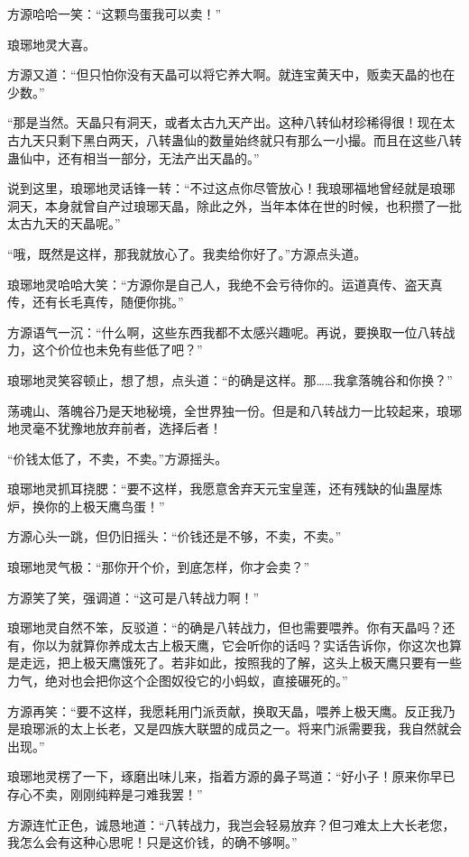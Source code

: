 \begin{this_body}
方源哈哈一笑：“这颗鸟蛋我可以卖！”

琅琊地灵大喜。

方源又道：“但只怕你没有天晶可以将它养大啊。就连宝黄天中，贩卖天晶的也在少数。”

“那是当然。天晶只有洞天，或者太古九天产出。这种八转仙材珍稀得很！现在太古九天只剩下黑白两天，八转蛊仙的数量始终就只有那么一小撮。而且在这些八转蛊仙中，还有相当一部分，无法产出天晶的。”

说到这里，琅琊地灵话锋一转：“不过这点你尽管放心！我琅琊福地曾经就是琅琊洞天，本身就曾自产过琅琊天晶，除此之外，当年本体在世的时候，也积攒了一批太古九天的天晶呢。”

“哦，既然是这样，那我就放心了。我卖给你好了。”方源点头道。

琅琊地灵哈哈大笑：“方源你是自己人，我绝不会亏待你的。运道真传、盗天真传，还有长毛真传，随便你挑。”

方源语气一沉：“什么啊，这些东西我都不太感兴趣呢。再说，要换取一位八转战力，这个价位也未免有些低了吧？”

琅琊地灵笑容顿止，想了想，点头道：“的确是这样。那……我拿落魄谷和你换？”

荡魂山、落魄谷乃是天地秘境，全世界独一份。但是和八转战力一比较起来，琅琊地灵毫不犹豫地放弃前者，选择后者！

“价钱太低了，不卖，不卖。”方源摇头。

琅琊地灵抓耳挠腮：“要不这样，我愿意舍弃天元宝皇莲，还有残缺的仙蛊屋炼炉，换你的上极天鹰鸟蛋！”

方源心头一跳，但仍旧摇头：“价钱还是不够，不卖，不卖。”

琅琊地灵气极：“那你开个价，到底怎样，你才会卖？”

方源笑了笑，强调道：“这可是八转战力啊！”

琅琊地灵自然不笨，反驳道：“的确是八转战力，但也需要喂养。你有天晶吗？还有，你以为就算你养成太古上极天鹰，它会听你的话吗？实话告诉你，你这次也算是走远，把上极天鹰饿死了。若非如此，按照我的了解，这头上极天鹰只要有一些力气，绝对也会把你这个企图奴役它的小蚂蚁，直接碾死的。”

方源再笑：“要不这样，我愿耗用门派贡献，换取天晶，喂养上极天鹰。反正我乃是琅琊派的太上长老，又是四族大联盟的成员之一。将来门派需要我，我自然就会出现。”

琅琊地灵楞了一下，琢磨出味儿来，指着方源的鼻子骂道：“好小子！原来你早已存心不卖，刚刚纯粹是刁难我罢！”

方源连忙正色，诚恳地道：“八转战力，我岂会轻易放弃？但刁难太上大长老您，我怎么会有这种心思呢！只是这价钱，的确不够啊。”


\end{this_body}
